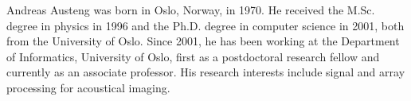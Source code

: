 \documentclass[10pt,journal,draftclsnofoot,onecolumn]{IEEEtran}
\newcommand\1{\vec 1}
\begin{document}
\begin{IEEEbiography}{Andreas Austeng}
was born in Oslo, Norway, in 1970. He received the M.Sc. degree in physics in 1996 and the Ph.D. degree in computer science in 2001, both from the University of Oslo. Since 2001, he has been working at the Department of Informatics, University of Oslo, first as a postdoctoral research fellow and currently as an associate professor. His research interests include signal and array processing for acoustical imaging.
\end{IEEEbiography}

\vfill 
\end{document}
